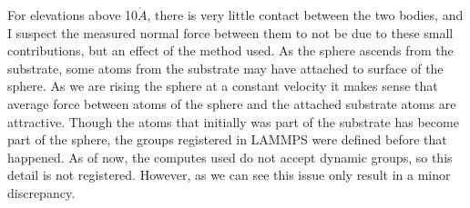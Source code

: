 \documentclass[twoside,english]{uiofysmaster}
\begin{document}
For elevations above 10$\mathring{A}$, there is very little contact between the two bodies, and I suspect the measured normal force between them to not be due to these small contributions, but an effect of the method used. 
As the sphere ascends from the substrate, some atoms from the substrate may have attached to surface of the sphere. 
As we are rising the sphere at a constant velocity it makes sense that average force between atoms of the sphere and the attached substrate atoms are attractive. 
Though the atoms that initially was part of the substrate has become part of the sphere, the groups registered in LAMMPS were defined before that happened. 
As of now, the computes used do not accept dynamic groups, so this detail is not registered. 
However, as we can see this issue only result in a minor discrepancy. 
\end{document}
